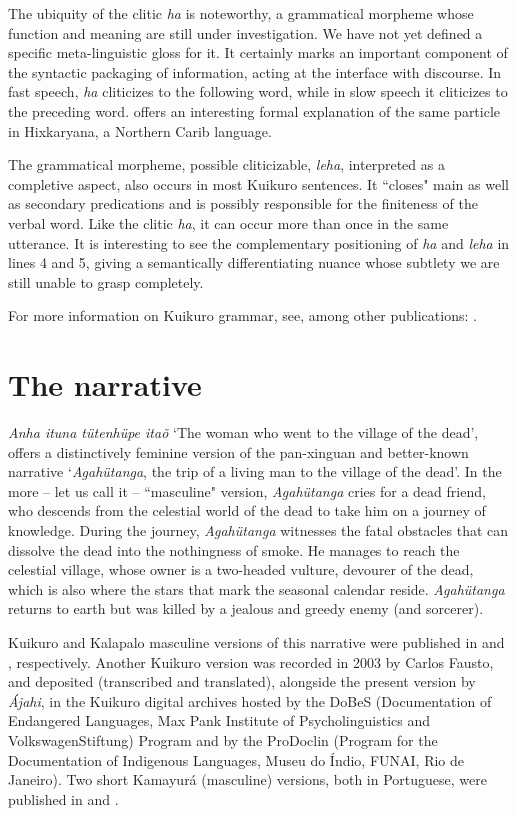 \documentclass[output=paper,
modfonts,nonflat
]{langsci/langscibook}
\begin{document}
The ubiquity of the clitic \emph{ha} is noteworthy, a grammatical morpheme whose function and meaning are still under investigation. We have not yet defined a specific meta-linguistic gloss for it. It certainly marks an important component of the syntactic packaging of information, acting at the interface with discourse. In fast speech, \emph{ha} cliticizes to the following word, while in slow speech it cliticizes to the preceding word. \citet{Kalin2014} offers an interesting formal explanation of the same particle in Hixkaryana, a Northern Carib language.

The grammatical morpheme, possible cliticizable, \emph{leha}, interpreted as a completive aspect, also occurs in most Kuikuro sentences. It “closes" main as well as secondary predications and is possibly responsible for the finiteness of the verbal word. Like the clitic \emph{ha}, it can occur more than once in the same utterance. It is interesting to see the complementary positioning of \emph{ha} and \emph{leha} in  lines 4 and 5, giving a semantically differentiating nuance whose subtlety we are still unable to grasp completely.

For more information on Kuikuro grammar, see, among other publications: \citet{Franchetto1986,Franchetto2010,Franchetto2015,Santos2007,FranchettoSantos2009,FranchettoSantos2010,LimaEtAl2013}.

\section{The narrative}
\emph{Anha ituna tütenhüpe itaõ} ‘The woman who went to the village of the dead’, offers a distinctively feminine version of the pan-xinguan and better-known narrative ‘\emph{Agahütanga}, the trip of a living man to the village of the dead'. In the more – let us call it – “masculine" version, \emph{Agahütanga} cries for a dead friend, who descends from the celestial world of the dead to take him on a journey of knowledge. During the journey, \emph{Agahütanga} witnesses the fatal obstacles that can dissolve the dead into the nothingness of smoke. He manages to reach the celestial village, whose owner is a two-headed vulture, devourer of the dead, which is also where the stars that mark the seasonal calendar reside. \emph{Agahütanga} returns to earth but was killed by a jealous and greedy enemy (and sorcerer).

Kuikuro and Kalapalo masculine versions of this narrative were published in \citet{Carneiro1977} and \citet[91--140]{Basso1985}, respectively. Another Kuikuro version was recorded in 2003 by Carlos Fausto, and deposited (transcribed and translated), alongside the present version by \emph{Ájahi}, in the Kuikuro digital archives hosted by the DoBeS (Documentation of Endangered Languages, Max Pank Institute of Psycholinguistics and VolkswagenStiftung) Program and by the ProDoclin (Program for the Documentation of Indigenous Languages, Museu do Índio, FUNAI, Rio de Janeiro). Two short Kamayurá (masculine) versions, both in Portuguese, were published in \citet[122--130]{VillasBoas1970} and \citet[200--201]{Agostinho1974}.
\end{document}
